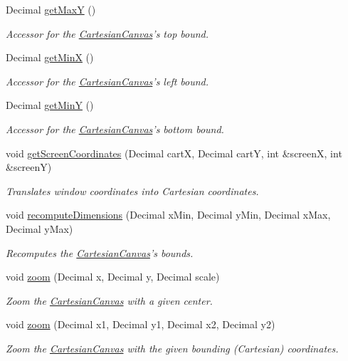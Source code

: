 \begin{DoxyCompactItemize}
Decimal \hyperlink{class_cartesian_canvas_a84b1a32b3af487cea0588bd6f09a246e}{get\+Max\+Y} ()
\begin{DoxyCompactList}\small\item\em Accessor for the \hyperlink{class_cartesian_canvas}{Cartesian\+Canvas}'s top bound. \end{DoxyCompactList}\item 
Decimal \hyperlink{class_cartesian_canvas_a598f84f3fda5bea7df9a90952c60ee2c}{get\+Min\+X} ()
\begin{DoxyCompactList}\small\item\em Accessor for the \hyperlink{class_cartesian_canvas}{Cartesian\+Canvas}'s left bound. \end{DoxyCompactList}\item 
Decimal \hyperlink{class_cartesian_canvas_a970a5877d36bc958564556cae1c3c1cb}{get\+Min\+Y} ()
\begin{DoxyCompactList}\small\item\em Accessor for the \hyperlink{class_cartesian_canvas}{Cartesian\+Canvas}'s bottom bound. \end{DoxyCompactList}\item 
void \hyperlink{class_cartesian_canvas_abfe025d3658afe6cf30057e4db7bbc19}{get\+Screen\+Coordinates} (Decimal cart\+X, Decimal cart\+Y, int \&screen\+X, int \&screen\+Y)
\begin{DoxyCompactList}\small\item\em Translates window coordinates into Cartesian coordinates. \end{DoxyCompactList}\item 
void \hyperlink{class_cartesian_canvas_a390eb6c87ec9974bc0c9930e8a8d40ac}{recompute\+Dimensions} (Decimal x\+Min, Decimal y\+Min, Decimal x\+Max, Decimal y\+Max)
\begin{DoxyCompactList}\small\item\em Recomputes the \hyperlink{class_cartesian_canvas}{Cartesian\+Canvas}'s bounds. \end{DoxyCompactList}\item 
void \hyperlink{class_cartesian_canvas_adffe30c84884e8046ebb30438ee8eef1}{zoom} (Decimal x, Decimal y, Decimal scale)
\begin{DoxyCompactList}\small\item\em Zoom the \hyperlink{class_cartesian_canvas}{Cartesian\+Canvas} with a given center. \end{DoxyCompactList}\item 
void \hyperlink{class_cartesian_canvas_a048f37a8e92d248edad546d470432f3c}{zoom} (Decimal x1, Decimal y1, Decimal x2, Decimal y2)
\begin{DoxyCompactList}\small\item\em Zoom the \hyperlink{class_cartesian_canvas}{Cartesian\+Canvas} with the given bounding (Cartesian) coordinates. \end{DoxyCompactList}\end{DoxyCompactItemize}
